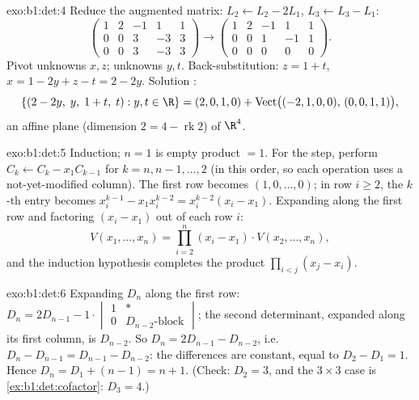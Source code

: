 \begin{solution}{exo:b1:det:4}
Reduce the augmented matrix: $L_2 \leftarrow L_2 - 2L_1$, $L_3
\leftarrow L_3 - L_1$:
\[
\begin{pmatrix}
1 & 2 & -1 & 1 & 1\\
0 & 0 & 3 & -3 & 3\\
0 & 0 & 3 & -3 & 3
\end{pmatrix}
\to
\begin{pmatrix}
1 & 2 & -1 & 1 & 1\\
0 & 0 & 1 & -1 & 1\\
0 & 0 & 0 & 0 & 0
\end{pmatrix}.
\]
Pivot unknowns $x, z$;  unknowns $y, t$. Back-substitution: $z =
1 + t$, $x = 1 - 2y + z - t = 2 - 2y$. Solution :
\[
\{(2 - 2y,\; y,\; 1 + t,\; t) : y, t \in \R\}
= (2, 0, 1, 0) + \operatorname{Vect}\bigl((-2,1,0,0),\,
(0,0,1,1)\bigr),
\]
an affine plane (dimension $2 = 4 - \operatorname{rk} 2$) of $\R^4$.
\end{solution}

\begin{solution}{exo:b1:det:5}
Induction; $n = 1$ is empty product $= 1$. For the step, perform
$C_k \leftarrow C_k - x_1 C_{k-1}$ for $k = n, n-1, \dots, 2$ (in
this order, so each operation uses a not-yet-modified column). The
first row becomes $(1, 0, \dots, 0)$; in row $i \geq 2$, the $k$-th
entry becomes $x_i^{k-1} - x_1 x_i^{k-2} = x_i^{k-2}(x_i - x_1)$.
Expanding along the first row and factoring $(x_i - x_1)$ out of
each row $i$:
\[
V(x_1, \dots, x_n)
= \prod_{i=2}^{n} (x_i - x_1)\cdot V(x_2, \dots, x_n),
\]
and the induction hypothesis completes the product $\prod_{i<j}(x_j
- x_i)$.
\end{solution}

\begin{solution}{exo:b1:det:6}
Expanding $D_n$ along the first row: $D_n = 2 D_{n-1} -
1\cdot\begin{vmatrix} 1 & \ast\\ 0 & D_{n-2}\text{-block}
\end{vmatrix}$; the second determinant, expanded along its first
column, is $D_{n-2}$. So $D_n = 2D_{n-1} - D_{n-2}$, i.e.\ $D_n -
D_{n-1} = D_{n-1} - D_{n-2}$: the differences are constant, equal to
$D_2 - D_1 = 1$. Hence $D_n = D_1 + (n - 1) = n + 1$.
(Check: $D_2 = 3$, and the $3\times3$ case is
\cref{ex:b1:det:cofactor}: $D_3 = 4$.)
\end{solution}

